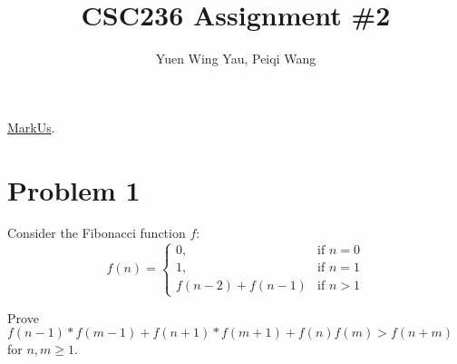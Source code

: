 \documentclass[11pt]{article}
\title{CSC236 Assignment \#2}
\author{Yuen Wing Yau, Peiqi Wang}
\theoremstyle{plain}%
\theoremstyle{definition}
\theoremstyle{remark}
\begin{document}
\maketitle

\href{https://markus.cdf.toronto.edu/csc236-2016-09}{MarkUs}.


\section*{Problem 1}
Consider the Fibonacci function $f$:
  \begin{equation*}
    f(n) =
    \begin{cases}
      0, & \text{if $n = 0$} \\
      1, & \text{if $n = 1$} \\
      f(n-2) + f(n-1) & \text{if }n> 1
    \end{cases}
  \end{equation*}

  Prove $f(n-1)*f(m-1)+f(n+1)*f(m+1)+f(n)f(m) > f(n+m)$ for $n,m\geq 1$.
\end{document}
